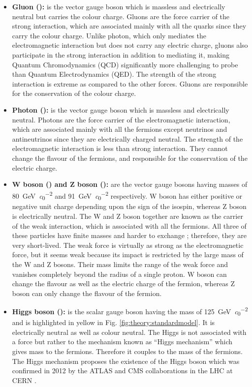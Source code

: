 \begin{itemize}
	\item \textbf{Gluon (\Pgluon):} is the vector gauge boson which is massless and electrically neutral but carries the colour charge. Gluons are the force carrier of the strong interaction, which are associated mainly with all the quarks since they carry the colour charge. Unlike photon, which only mediates the electromagnetic interaction but does not carry any electric charge, gluons also participate in the strong interaction in addition to mediating it, making Quantum Chromodynamics (QCD) significantly more challenging to probe than Quantum Electrodynamics (QED). The strength of the strong interaction is extreme as compared to the other forces. Gluons are responsible for the conservation of the colour charge.
	
	\item \textbf{Photon (\Pphoton):} is the vector gauge boson which is massless and electrically neutral. Photons are the force carrier of the electromagnetic interaction, which are associated mainly with all the fermions except neutrinos and antineutrinos since they are electrically charged neutral. The strength of the electromagnetic interaction is less than strong interaction. They cannot change the flavour of the fermions, and responsible for the conservation of the electric charge.
	
	\item \textbf{W boson (\PWpm) and Z boson (\PZzero):} are the vector gauge bosons having masses of \SI[per-mode=symbol]{80}{\giga\electronvolt\per\clight^2} and \SI[per-mode=symbol]{91}{\giga\electronvolt\per\clight^2} respectively.  W boson has either positive or negative unit charge depending upon the sign of the isospin, whereas Z boson is electrically neutral. The W and Z boson together are known as the carrier of the weak interaction, which is associated with all the fermions. All three of these particles have finite masses and harder to exchange \cite{thesis:tanja}; therefore, they are very short-lived. The weak force is virtually as strong as the electromagnetic force, but it seems weak because its impact is restricted by the large mass of the W and Z bosons. Their mass limits the range of the weak force and vanishes completely beyond the radius of a single proton. W boson can change the flavour as well as the electric charge of the fermion, whereas Z boson can only change the flavour of the fermion.
	
	\item \textbf{Higgs boson (\PHiggs):} is the scalar gauge boson having the mass of \SI[per-mode=symbol]{125}{\giga\electronvolt\per\clight^2} and is highlighted in yellow in Fig. \ref{fig:theory:standardmodel}. It is electrically neutral as well as colour neutral. The Higgs is not associated with a force but rather to the mechanism known as \enquote{Higgs mechanism} which gives mass to the fermions. Therefore it couples to the mass of the fermions. The Higgs mechanism proposes the existence of the Higgs boson which was confirmed in 2012 by the ATLAS and CMS collaborations in the LHC at CERN \cite{higgsatlas,higgscms}.
	
\end{itemize}



